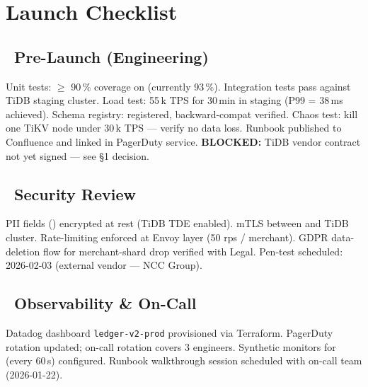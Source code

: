 \section{Launch Checklist}

\subsection*{\faRocket\ Pre-Launch (Engineering)}
\begin{itemize}
  \cdone Unit tests: $\geq$ 90\,\% coverage on  (currently 93\,\%).
  \cdone Integration tests pass against TiDB staging cluster.
  \cdone Load test: 55\,k TPS for 30\,min in staging (P99 = 38\,ms achieved).
  \cdone Schema registry:  registered, backward-compat verified.
  \copen Chaos test: kill one TiKV node under 30\,k TPS — verify no data loss.
  \copen Runbook published to Confluence and linked in PagerDuty service.
  \cblock \textbf{BLOCKED:} TiDB vendor contract not yet signed — see \S1 decision.
\end{itemize}

\subsection*{\faLock\ Security Review}
\begin{itemize}
  \cdone PII fields () encrypted at rest (TiDB TDE enabled).
  \cdone mTLS between  and TiDB cluster.
  \cdone Rate-limiting enforced at Envoy layer (50 rps / merchant).
  \copen GDPR data-deletion flow for merchant-shard drop verified with Legal.
  \copen Pen-test scheduled: 2026-02-03 (external vendor — NCC Group).
\end{itemize}

\subsection*{\faChartBar\ Observability \& On-Call}
\begin{itemize}
  \cdone Datadog dashboard \texttt{ledger-v2-prod} provisioned via Terraform.
  \cdone PagerDuty rotation updated; on-call rotation covers 3 engineers.
  \copen Synthetic monitors for  (every 60\,s) configured.
  \copen Runbook walkthrough session scheduled with on-call team (2026-01-22).
\end{itemize}

